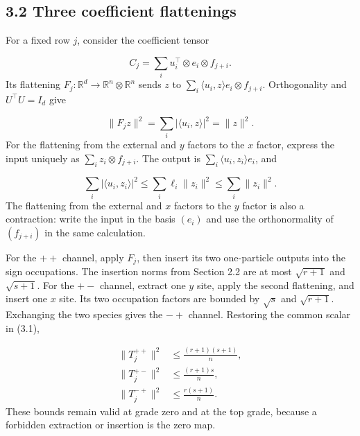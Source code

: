 \documentclass[11pt,a4paper]{article}
\begin{document}
\subsection*{3.2 Three coefficient flattenings}
For a fixed row \(j\), consider the coefficient tensor

\begin{equation}
C_j=\sum_i u_i^\top\otimes e_i\otimes f_{j+i}.
\tag{3.4}
\end{equation}
Its flattening \(F_j:\mathbb R^d\to\mathbb R^n\otimes\mathbb R^n\) sends \(z\) to \(\sum_i\langle u_i,z\rangle e_i\otimes f_{j+i}\). Orthogonality and \(U^\top U=I_d\) give

\begin{equation}
\|F_jz\|^2=\sum_i|\langle u_i,z\rangle|^2=\|z\|^2.
\tag{3.5}
\end{equation}
For the flattening from the external and \(y\) factors to the \(x\) factor, express the input uniquely as \(\sum_i z_i\otimes f_{j+i}\). The output is \(\sum_i\langle u_i,z_i\rangle e_i\), and

\begin{equation}
\sum_i|\langle u_i,z_i\rangle|^2
\le\sum_i\ell_i\|z_i\|^2
\le\sum_i\|z_i\|^2.
\tag{3.6}
\end{equation}
The flattening from the external and \(x\) factors to the \(y\) factor is also a contraction: write the input in the basis \((e_i)\) and use the orthonormality of \((f_{j+i})\) in the same calculation.

For the \(++\) channel, apply \(F_j\), then insert its two one-particle outputs into the sign occupations. The insertion norms from Section 2.2 are at most \(\sqrt{r+1}\) and \(\sqrt{s+1}\). For the \(+-\) channel, extract one \(y\) site, apply the second flattening, and insert one \(x\) site. Its two occupation factors are bounded by \(\sqrt s\) and \(\sqrt{r+1}\). Exchanging the two species gives the \(-+\) channel. Restoring the common scalar in (3.1),

\begin{equation}
\begin{aligned}
\|T_j^{++}\|^2&\le\frac{(r+1)(s+1)}n,\\
\|T_j^{+-}\|^2&\le\frac{(r+1)s}n,\\
\|T_j^{-+}\|^2&\le\frac{r(s+1)}n.
\end{aligned}
\tag{3.7}
\end{equation}
These bounds remain valid at grade zero and at the top grade, because a forbidden extraction or insertion is the zero map.
\end{document}

